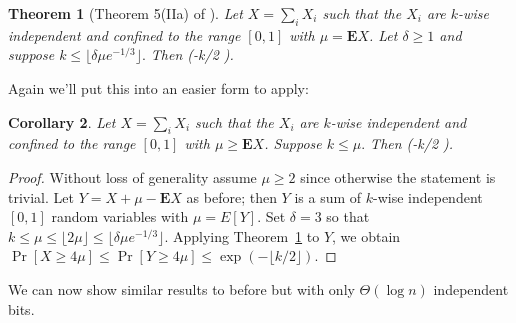 \documentclass[11pt,a4paper]{article}
\newtheorem{theorem}{Theorem}
\newtheorem{corollary}[theorem]{Corollary}
\newcommand*{\E}[0]{\mathbf{E}}
\def\[#1\]{\begin{align*}#1\end{align*}}
\begin{document}
\begin{theorem}[Theorem 5(IIa) of \cite{limited-chernoff}]
  \label{thm:limited-chernoff}
  Let \(X = \sum_i X_i\) such that the \(X_i\) are \(k\)-wise independent and confined to the range \([0, 1]\) with \(\mu = \E X\).
  Let \(\delta \ge 1\) and suppose \(k \le \lfloor \delta \mu e^{-1/3} \rfloor.\)
  Then \[\Pr[X \ge (1 + \delta)\mu] \le \exp(-\lfloor k/2 \rfloor).\]
\end{theorem}

Again we'll put this into an easier form to apply:

\begin{tcolorbox}
  \begin{corollary}
    \label{cor:limited-chernoff-simple}
    Let \(X = \sum_i X_i\) such that the \(X_i\) are \(k\)-wise independent and confined to the range \([0, 1]\) with \(\mu \ge \E X\).
    Suppose \(k \le \mu.\)
    Then \[\Pr[X \ge 4\mu] \le \exp(-\lfloor k/2 \rfloor).\]
  \end{corollary}
\end{tcolorbox}
\begin{proof}
  Without loss of generality assume \(\mu \ge 2\) since otherwise the statement is trivial.
  Let \(Y = X + \mu - \E X\) as before; then \(Y\) is a sum of \(k\)-wise independent \([0, 1]\) random variables with \(\mu = E[Y]\).
  Set \(\delta = 3\) so that \(k \le \mu \le \lfloor 2\mu \rfloor \le \lfloor \delta \mu e^{-1/3} \rfloor\).
  Applying Theorem~\ref{thm:limited-chernoff} to \(Y\), we obtain
  \(\Pr[X \ge 4\mu] \le \Pr[Y \ge 4\mu] \le \exp(-\lfloor k/2 \rfloor).\)
\end{proof}

We can now show similar results to before but with only \(\Theta(\log n)\) independent bits.
\end{document}
